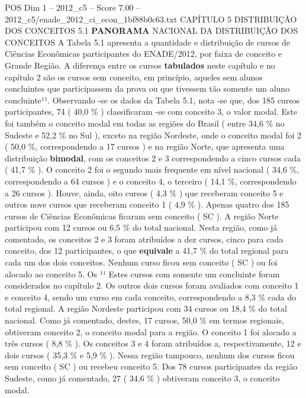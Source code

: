 \begin{textsample}{POS Dim 1 – 2012\_c5 – Score 7.00 – 2012\_c5/enade\_2012\_ci\_econ\_1bf88b0c63.txt}  \label{ex:f1_pos_111}
CAPÍTULO 5 DISTRIBUIÇÃO DOS CONCEITOS 5.1 \textbf{PANORAMA} NACIONAL DA DISTRIBUIÇÃO DOS CONCEITOS A Tabela 5.1 apresenta a quantidade e distribuição de cursos de Ciências Econômicas participantes do ENADE/2012, por faixa de conceito e Grande Região.
A diferença entre os cursos \textbf{tabulados} neste capítulo e no capítulo 2 são os cursos sem conceito, em princípio, aqueles sem alunos concluintes que participassem da prova ou que tivessem tão somente um aluno concluinte¹¹.
Observando -se os dados da Tabela 5.1, nota -se que, dos 185 cursos participantes, 74 ( 40,0 \% ) classificaram -se com conceito 3, o valor modal.
Este foi também o conceito modal em todas as regiões do Brasil ( entre 34,6 \% no Sudeste e 52,2 \% no Sul ), exceto na região Nordeste, onde o conceito modal foi 2 ( 50,0 \%, correspondendo a 17 cursos ) e na região Norte, que apresenta uma distribuição \textbf{bimodal}, com os conceitos 2 e 3 correspondendo a cinco cursos cada ( 41,7 \% ).
O conceito 2 foi o segundo mais frequente em nível nacional ( 34,6 \%, correspondendo a 64 cursos ) e o conceito 4, o terceiro ( 14,1 \%, correspondendo a 26 cursos ).
Houve, ainda, oito cursos ( 4,3 \% ) que receberam conceito 5 e outros nove cursos que receberam conceito 1 ( 4,9 \% ).
Apenas quatro dos 185 cursos de Ciências Econômicas ficaram sem conceito ( SC ).
A região Norte participou com 12 cursos ou 6,5 \% do total nacional.
Nesta região, como já comentado, os conceitos 2 e 3 foram atribuídos a dez cursos, cinco para cada conceito, dos 12 participantes, o que \textbf{equivale} a 41,7 \% do total regional para cada um dos dois conceitos.
Nenhum curso ficou sem conceito ( SC ) ou foi alocado ao conceito 5.
Os ¹¹ Estes cursos com somente um concluinte foram considerados no capítulo 2.
Os outros dois cursos foram avaliados com conceito 1 e conceito 4, sendo um curso em cada conceito, correspondendo a 8,3 \% cada do total regional.
A região Nordeste participou com 34 cursos ou 18,4 \% do total nacional.
Como já comentado, destes, 17 cursos, 50,0 \% em termos regionais, obtiveram conceito 2, o conceito modal para a região.
O conceito 1 foi alocado a três cursos ( 8,8 \% ).
Os conceitos 3 e 4 foram atribuídos a, respectivamente, 12 e dois cursos ( 35,3 \% e 5,9 \% ).
Nessa região tampouco, nenhum dos cursos ficou sem conceito ( SC ) ou recebeu conceito 5.
Dos 78 cursos participantes da região Sudeste, como já comentado, 27 ( 34,6 \% ) obtiveram conceito 3, o conceito modal.

\end{textsample}
